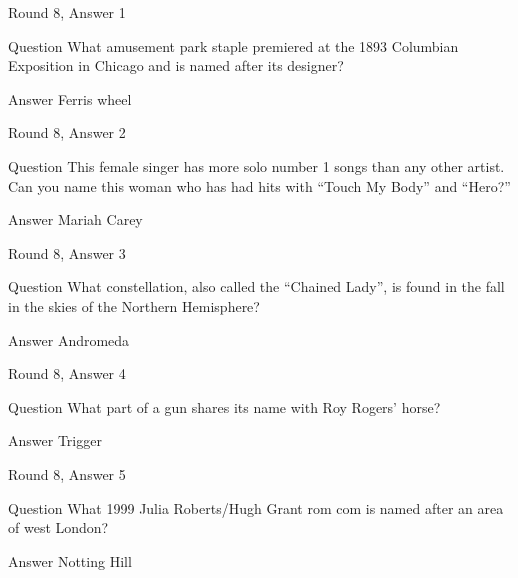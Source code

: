 \documentclass[11pt]{beamer}
\begin{document}
\begin{frame}[t]{Round 8, Answer 1}
\vspace{2em}
\begin{block}{Question}
What amusement park staple premiered at the 1893 Columbian Exposition in Chicago and is named after its designer\@?
\end{block}
\pause{}
\begin{block}{Answer}
Ferris wheel
\end{block}
\end{frame}
    

\begin{frame}[t]{Round 8, Answer 2}
\vspace{2em}
\begin{block}{Question}
This female singer has more solo number 1 songs than any other artist. Can you name this woman who has had hits with ``Touch My Body'' and ``Hero?''
\end{block}
\pause{}
\begin{block}{Answer}
Mariah Carey
\end{block}
\end{frame}
    

\begin{frame}[t]{Round 8, Answer 3}
\vspace{2em}
\begin{block}{Question}
What constellation, also called the ``Chained Lady'', is found in the fall in the skies of the Northern Hemisphere\@?
\end{block}
\pause{}
\begin{block}{Answer}
Andromeda
\end{block}
\end{frame}
    

\begin{frame}[t]{Round 8, Answer 4}
\vspace{2em}
\begin{block}{Question}
What part of a gun shares its name with Roy Rogers' horse\@?
\end{block}
\pause{}
\begin{block}{Answer}
Trigger
\end{block}
\end{frame}
    

\begin{frame}[t]{Round 8, Answer 5}
\vspace{2em}
\begin{block}{Question}
What 1999 Julia Roberts/Hugh Grant rom com is named after an area of west London\@?
\end{block}
\pause{}
\begin{block}{Answer}
Notting Hill
\end{block}
\end{frame}
    
\end{document}
